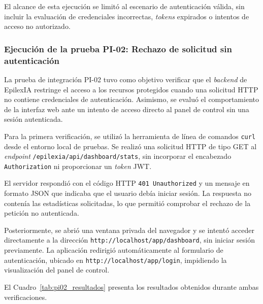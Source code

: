 El alcance de esta ejecución se limitó al escenario de autenticación válida, sin incluir la evaluación de credenciales incorrectas, \textit{tokens} expirados o intentos de acceso no autorizado.



\subsubsection{Ejecución de la prueba PI-02: Rechazo de solicitud sin autenticación}

La prueba de integración PI-02 tuvo como objetivo verificar que el \textit{backend} de EpilexIA restringe el acceso a los recursos protegidos cuando una solicitud HTTP no contiene credenciales de autenticación. Asimismo, se evaluó el comportamiento de la interfaz web ante un intento de acceso directo al panel de control sin una sesión autenticada.

Para la primera verificación, se utilizó la herramienta de línea de comandos \texttt{curl} desde el entorno local de pruebas. Se realizó una solicitud HTTP de tipo GET al \textit{endpoint} \texttt{/epilexia/api/dashboard/stats}, sin incorporar el encabezado \texttt{Authorization} ni proporcionar un \textit{token} JWT.

El servidor respondió con el código HTTP \texttt{401 Unauthorized} y un mensaje en formato JSON que indicaba que el usuario debía iniciar sesión. La respuesta no contenía las estadísticas solicitadas, lo que permitió comprobar el rechazo de la petición no autenticada.

Posteriormente, se abrió una ventana privada del navegador y se intentó acceder directamente a la dirección \texttt{http://localhost/app/dashboard}, sin iniciar sesión previamente. La aplicación redirigió automáticamente al formulario de autenticación, ubicado en \texttt{http://localhost/app/login}, impidiendo la visualización del panel de control.

El Cuadro~\ref{tab:pi02_resultados} presenta los resultados obtenidos durante ambas verificaciones.


